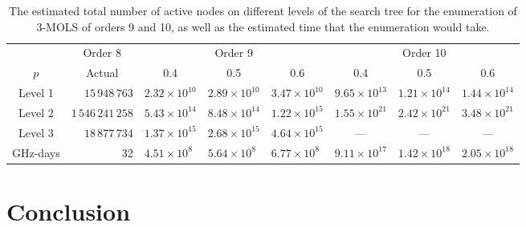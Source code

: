 \documentclass[11pt, a4paper]{article}
\newcounter{ls}
\begin{document}
\begin{table}[t]
\begin{tabular}{ crllllll }
\toprule
 & \multicolumn{1}{c}{ Order 8} & \multicolumn{3}{c}{Order 9}  & \multicolumn{3}{c}{Order 10}   \\ 
\cmidrule(lr){2-2} \cmidrule(lr){3-5}\cmidrule(lr){6-8}
$p$ & \multicolumn{1}{c}{Actual} & \multicolumn{1}{c}{0.4} & \multicolumn{1}{c}{0.5} &\multicolumn{1}{c}{0.6} & \multicolumn{1}{c}{0.4} & \multicolumn{1}{c}{0.5} &\multicolumn{1}{c}{0.6} \\ \midrule[\lightrulewidth]
Level 1 & $15\,948\,763$ & $2.32\times 10^{10}$ & $2.89\times 10^{10}$ & $3.47\times 10^{10}$  & $9.65\times 10^{13}$ & $1.21\times 10^{14}$ & $1.44\times 10^{14}$ \\ 
Level 2 & $1\,546\,241\,258$ & $5.43\times 10^{14}$ & $8.48\times 10^{14}$ & $1.22\times 10^{15}$  & $1.55\times 10^{21}$ & $2.42\times 10^{21}$ & $3.48\times 10^{21}$ \\ 
Level 3 & $18\,877\,734$ & $1.37\times 10^{15}$ & $2.68\times 10^{15}$ & $4.64\times 10^{15}$  & \multicolumn{1}{c}{---}  & \multicolumn{1}{c}{---}  &  \multicolumn{1}{c}{---} \\ \midrule[\lightrulewidth]
GHz-days   & 32& $4.51\times 10^{8}$ & $5.64\times 10^{8}$ & $6.77\times 10^{8}$&$9.11\times 10^{17}$&$1.42\times 10^{18}$&$2.05\times 10^{18}$\\ \bottomrule
\end{tabular} \vspace*{.4cm}
\caption{The estimated total number of active nodes on different levels of the search tree for the enumeration of 3-MOLS of orders 9 and 10, as well as the estimated  time that the enumeration would take.}
\label{activenodes} 
\end{table}
\section{Conclusion}
\end{document}
